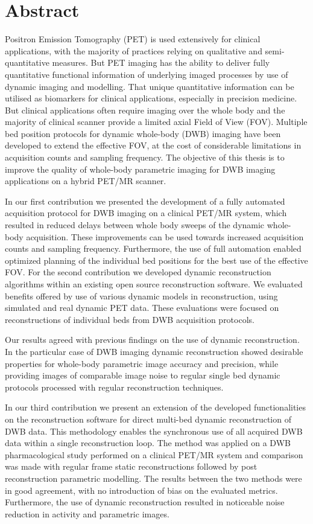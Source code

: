 \section*{Abstract}
Positron Emission Tomography (PET) is used extensively for clinical applications, with the majority of practices relying on qualitative and semi-quantitative measures. But PET imaging has the ability to deliver fully quantitative functional information of underlying imaged processes by use of dynamic imaging and modelling. That unique quantitative information can be utilised as biomarkers for clinical applications, especially in precision medicine. But clinical applications often require imaging over the whole body and the majority of clinical scanner provide a limited axial Field of View (FOV). Multiple bed position protocols for dynamic whole-body (DWB) imaging have been developed to extend the effective FOV, at the cost of considerable limitations in acquisition counts and sampling frequency. The objective of this thesis is to improve the quality of whole-body parametric imaging for DWB imaging applications on a hybrid PET/MR scanner.

In our first contribution we presented the development of a fully automated acquisition protocol for DWB imaging on a clinical PET/MR system, which resulted in reduced delays between whole body sweeps of the dynamic whole-body acquisition. These improvements can be used towards increased acquisition counts and sampling frequency. Furthermore, the use of full automation enabled optimized planning of the individual bed positions for the best use of the effective FOV. 
For the second contribution we developed dynamic reconstruction algorithms within an existing open source reconstruction software. We evaluated benefits offered by use of various dynamic models in reconstruction, using simulated and real dynamic PET data. These evaluations were focused on reconstructions of individual beds from DWB acquisition protocols.

Our results agreed with previous findings on the use of dynamic reconstruction. In the particular case of DWB imaging dynamic reconstruction showed desirable properties for whole-body parametric image accuracy and precision, while providing images of comparable image noise to regular single bed dynamic protocols processed with regular reconstruction techniques.

In our third contribution we present an extension of the developed functionalities on the reconstruction software for direct multi-bed dynamic reconstruction of DWB data. This methodology enables the synchronous use of all acquired DWB data within a single reconstruction loop. The method was applied on a DWB pharmacological study performed on a clinical PET/MR system and comparison was made with regular frame static reconstructions followed by post reconstruction parametric modelling. The results between the two methods were in good agreement, with no introduction of bias on the evaluated metrics. Furthermore, the use of dynamic reconstruction resulted in noticeable noise reduction in activity and parametric images.

